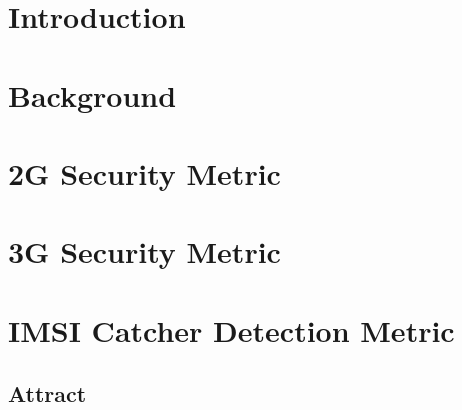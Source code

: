 \documentclass[a4paper,11pt,notitlepage,bigheadings,oneside]{scrartcl}
\begin{document}
\newcommand{\TBD}{{\color{srldark}\textbf{TBD}}}
\newcommand{\FIXME}[1]{{\color{srldark}\textit{TODO: #1}}}

\newcommand{\criterion}[2]{#2 [#1]}
\newcommand{\crita}[2]{\criterion{A#1}{#2}}
\newcommand{\critk}[2]{\criterion{K#1}{#2}}
\newcommand{\critc}[2]{\criterion{C#1}{#2}}
\newcommand{\critt}[2]{\criterion{T#1}{#2}}
\newcommand{\critr}[2]{\criterion{R#1}{#2}}
\newcommand{\critp}[2]{\criterion{P#1}{#2}}

\maketitle
\pagebreak

\tableofcontents
\pagebreak

\section{Introduction}
\label{sec:introduction}

\section{Background}
\label{sec:background}



\section{2G Security Metric}
\label{sec:2g_security_metric}

\section{3G Security Metric}
\label{sec:3g_security_metric}

\section{IMSI Catcher Detection Metric}
\label{sec:imsi_catcher_detection_metric}

\subsection{Attract}
\end{document}
